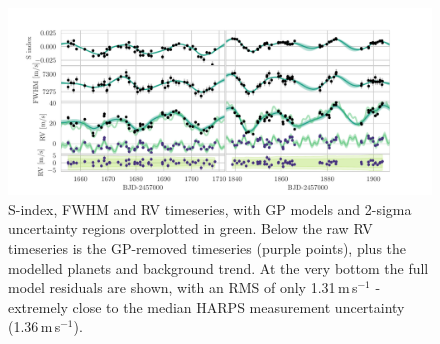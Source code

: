 \documentclass[fleqn,usenatbib]{mnras}
\newcommand{\ms}{m\,s$^{-1}$}
\newcommand{\TSindexperiod}{ $ 39.0 \pm 11.0 $ }
\begin{document}

\begin{figure}
	\includegraphics[width=\textwidth, trim={0.85cm 0.8 1.9cm 0.4cm}]{Combined_RV_plots_3_GPs_nontransiting_c.pdf}
    \caption{S-index, FWHM and RV timeseries, with GP models and 2-sigma uncertainty regions overplotted in green. Below the raw RV timeseries is the GP-removed timeseries (purple points), plus the modelled planets and background trend. At the very bottom the full model residuals are shown, with an RMS of only 1.31\,\ms{} - extremely close to the median HARPS measurement uncertainty (1.36\,\ms{}).}
    \label{fig:RVs}
\end{figure}
\end{document}
